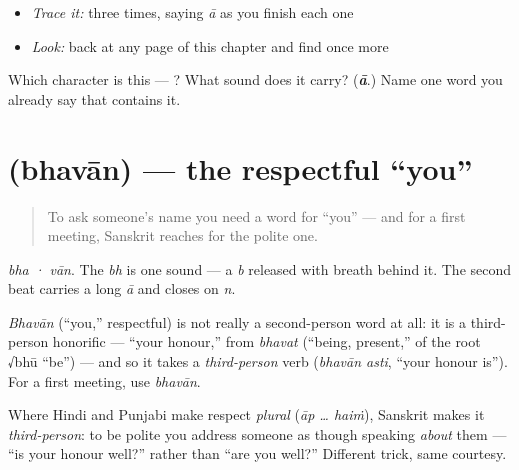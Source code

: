\begin{itemize}
\raggedright
  \item \emph{Trace it:}  three times, saying \emph{ā} as you finish each one
  \item \emph{Look:} back at any page of this chapter and find  once more
\end{itemize}

\begin{tcolorbox}[breakable,colback=teal!4,colframe=teal!35!black,title={Before you move on}]
Which character is this — ? What sound does it carry? (\emph{\textbf{ā}}.) Name one word you already say that contains it.
\end{tcolorbox}
\section[\texorpdfstring{\sk{भवान्} (bhavān)}{भवान् (bhavān)}]{ (bhavān) — the respectful \textquotedblleft{}you\textquotedblright{}}

\label{lesson:SA-C02-bhavan}



\begin{quote}
To ask someone's name you need a word for \textquotedblleft{}you\textquotedblright{} — and for a first meeting, Sanskrit reaches for the polite one.
\end{quote}

\begin{sounds}
\emph{bha · vān}. The \emph{bh} is one sound — a \emph{b} released with breath behind it. The second beat carries a long \emph{ā} and closes on \emph{n}.
\end{sounds}

\begin{cousinweb}
\emph{Bhavān} (\textquotedblleft{}you,\textquotedblright{} respectful) is not really a second-person word at all: it is a third-person honorific — \textquotedblleft{}your honour,\textquotedblright{} from \emph{bhavat} (\textquotedblleft{}being, present,\textquotedblright{} of the root √bhū \textquotedblleft{}be\textquotedblright{}) — and so it takes a \emph{third-person} verb (\emph{bhavān asti}, \textquotedblleft{}your honour is\textquotedblright{}). For a first meeting, use \emph{bhavān}.
\end{cousinweb}

\begin{grammarlens}[title={Grammar Lens: politeness by grammatical person}]
Where Hindi and Punjabi make respect \emph{plural} (\emph{āp … haiṁ}), Sanskrit makes it \emph{third-person}: to be polite you address someone as though speaking \emph{about} them — \textquotedblleft{}is your honour well?\textquotedblright{} rather than \textquotedblleft{}are you well?\textquotedblright{} Different trick, same courtesy.
\end{grammarlens}

